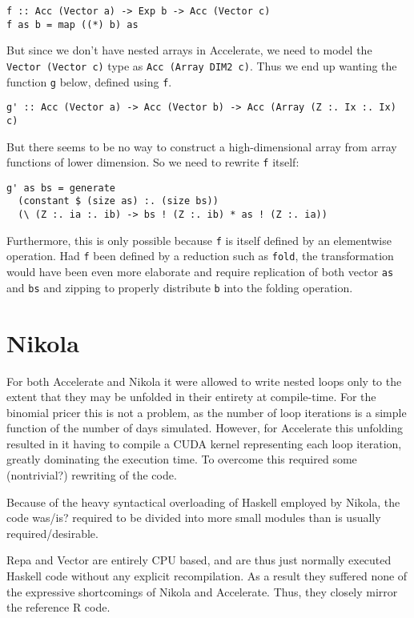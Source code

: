 \begin{verbatim}
f :: Acc (Vector a) -> Exp b -> Acc (Vector c)
f as b = map ((*) b) as
\end{verbatim}

But since we don't have nested arrays in Accelerate, we need to model the
\texttt{Vector (Vector c)} type  as \texttt{Acc (Array DIM2 c)}. Thus we end up
wanting the function \texttt{g} below, defined using \texttt{f}.

\begin{verbatim}
g' :: Acc (Vector a) -> Acc (Vector b) -> Acc (Array (Z :. Ix :. Ix) c)
\end{verbatim}

But there seems to be no way to construct a high-dimensional array from array
functions of lower dimension. So we need to rewrite \texttt{f} itself:

\begin{verbatim}
g' as bs = generate
  (constant $ (size as) :. (size bs))
  (\ (Z :. ia :. ib) -> bs ! (Z :. ib) * as ! (Z :. ia))
\end{verbatim}%

Furthermore, this is only possible because \texttt{f} is itself defined by an
elementwise operation. Had \texttt{f} been defined by a reduction such as
\texttt{fold}, the transformation would have been even more elaborate and
require replication of both vector \texttt{as} and \texttt{bs} and zipping to
properly distribute \texttt{b} into the folding operation.


\section{Nikola}

For both Accelerate and Nikola it were allowed to write nested loops only to
the extent that they may be unfolded in their entirety at compile-time. For the
binomial pricer this is not a problem, as the number of loop iterations is a
simple function of the number of days simulated.   However, for Accelerate this unfolding resulted in it
having to compile a CUDA kernel representing each loop iteration, greatly
dominating the execution time. To overcome this required some (nontrivial?)
rewriting of the code.

Because of the heavy syntactical overloading of Haskell employed by Nikola, the
code was/is? required to be divided into more small modules than is usually
required/desirable.

Repa and Vector are entirely CPU based, and are thus just normally executed
Haskell code without any explicit recompilation. As a result they suffered none
of the expressive shortcomings of Nikola and Accelerate. Thus, they closely
mirror the reference R code.


